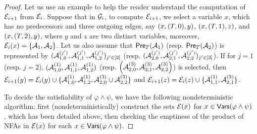\begin{proof}
Let us use an example to help the reader understand the computation of $\mathcal{E}_{i+1}$ from $\mathcal{E}_i$.  Suppose that in $\mathcal{G}_i$, to compute $\mathcal{E}_{i+1}$, we select a variable $x$, which has no predecessors and three outgoing edges, say $(x, (T, 0), y)$, $(x, (T, 1), z)$, and $(x, (T, 2), y)$, where $y$ and $z$ are two distinct variables, moreover, $\mathcal{E}_i(x) = \{\mathcal{A}_1, \mathcal{A}_2\}$. Let us also assume that  $\textsf{Pre}_{T}(\mathcal{A}_1)$ (resp. $\textsf{Pre}_{T}(\mathcal{A}_2)$) is represented by $(\mathcal{A}^{(j')}_{1, 0}, \mathcal{A}^{(j')}_{1, 1}, \mathcal{A}^{(j')}_{1, 2})_{ j'  \in [2]}$ (resp. $(\mathcal{A}^{(j')}_{2, 0}, \mathcal{A}^{(j')}_{2, 1}, \mathcal{A}^{(j')}_{2, 2})_{ j'  \in [3]}$). If for $j = 1$ (resp. $j=2$), $(\mathcal{A}^{(1)}_{1, 0}, \mathcal{A}^{(1)}_{1, 1}, \mathcal{A}^{(1)}_{1, 2})$  (resp. $\left(\mathcal{A}^{(3)}_{2, 0}, \mathcal{A}^{(3)}_{2, 1}, \mathcal{A}^{(3)}_{2, 2}\right)$)  is selected, then $\mathcal{E}_{i+1}(y) = \mathcal{E}_i(y) \cup \{\mathcal{A}^{(1)}_{1, 0}, \mathcal{A}^{(1)}_{1, 2}, \mathcal{A}^{(3)}_{2, 0} \cup \mathcal{A}^{(3)}_{2, 2}\}$ and $\mathcal{E}_{i+1}(z) = \mathcal{E}_{i}(z) \cup \{\mathcal{A}^{(1)}_{1, 1}, \mathcal{A}^{(3)}_{2, 1}\}$. 

To decide the satisfiability of $\varphi \wedge \psi$, we have the following nondeterministic algorithm: first (nondeterministically) construct the sets $\mathcal{E}(x)$ for $x \in \mathsf{Vars}(\varphi \wedge \psi)$, which has been detailed above, then 
checking the emptiness of the product of NFAs in $\mathcal{E}(x)$ for each $x \in \mathsf{Vars}(\varphi \wedge \psi)$.


\end{proof}
